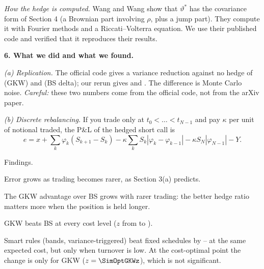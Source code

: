 \documentclass[10pt,leqno]{amsart}
\newcommand{\heading}[1]{\medskip\noindent\textbf{#1}\par}
\begin{document}
\begin{table}[h]
\centering\small

\caption{Model parameters used in the paper and its code (initial volatility $\sqrt{V_0}\approx\ParVolZero\%$).}
\end{table}

\noindent\emph{How the hedge is computed.} Wang and Wang show that $\vartheta^*$
has the covariance form of Section 4 (a Brownian part involving $\rho$, plus a
jump part). They compute it with Fourier methods and a Riccati--Volterra
equation. We use their published code and verified that it reproduces their
results.

\heading{6. What we did and what we found.}
\noindent\emph{(a) Replication.} The official code gives a variance reduction
against no hedge of \RepGKWStored{} (GKW) and \RepBSStored{} (BS delta); our
rerun gives \RepGKW{} and \RepBS{}. The difference is Monte Carlo noise.
\emph{Careful:} these two numbers come from the official code, not from the
arXiv paper.

\begin{table}[h]
\centering\small

\caption{Replication: variance reduction vs.\ no hedge.}
\label{tab:rep}
\end{table}

\noindent\emph{(b) Discrete rebalancing.} If you trade only at
$t_0<\dots<t_{N-1}$ and pay $\kappa$ per unit of notional traded, the P\&L of
the hedged short call is
\[
e = x + \sum_k\varphi_k(S_{k+1}-S_k) - \kappa\sum_k S_k|\varphi_k-\varphi_{k-1}|
 - \kappa S_N|\varphi_{N-1}| - Y .
\]

\begin{table}[h]
\centering\small

\caption{Simulation: variance reduction (s.e.) against the number of rebalancing dates.}
\end{table}

\noindent Findings.
\begin{compactitem}
\item Error grows as trading becomes rarer, as Section 3(a) predicts.
\item The GKW advantage over BS grows with rarer trading: the better hedge ratio
matters more when the position is held longer.
\item GKW beats BS at every cost level ($z$ from \SimGKWvsBSzMin{} to
\SimGKWvsBSzMax{}).
\item Smart rules (bands, variance-triggered) beat fixed schedules by
\SimLowGainMin--\SimLowGainMax{} at the same expected cost, but only when
turnover is low. At the cost-optimal point the change is only
\SimOptGKWChange{} for GKW ($z=\SimOptGKWz$), which is not significant.
\end{compactitem}
\end{document}

